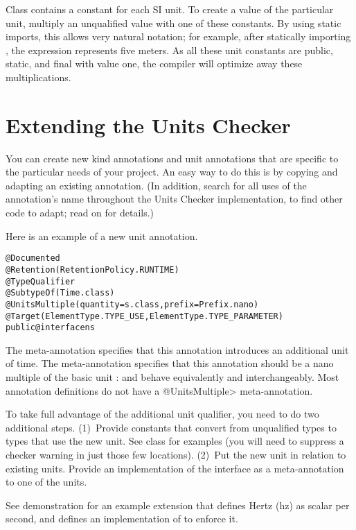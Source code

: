 Class  contains a constant for each SI unit.
To create a value of the particular unit, multiply an unqualified
value with one of these constants.
By using static imports, this allows very natural notation; for
example, after statically importing ,
the expression  represents five meters.
As all these unit constants are public, static, and final with value
one, the compiler will optimize away these multiplications.


\section{Extending the Units Checker\label{extending-units}}

You can create new kind annotations and unit annotations that are specific
to the particular needs of your project.  An easy way to do this is by
copying and adapting an existing annotation.  (In addition, search for all
uses of the annotation's name throughout the Units Checker implementation,
to find other code to adapt; read on for details.)

Here is an example of a new unit annotation.

\begin{alltt}
@Documented
@Retention(RetentionPolicy.RUNTIME)
@TypeQualifier
@SubtypeOf( \ttlcb{} Time.class \ttrcb{} )
@UnitsMultiple(quantity=s.class, prefix=Prefix.nano)
@Target({ElementType.TYPE_USE, ElementType.TYPE_PARAMETER})
public @interface ns \ttlcb{}\ttrcb{}
\end{alltt}

The  meta-annotation specifies that this annotation
introduces an additional unit of time.
The  meta-annotation specifies that this annotation
should be a nano multiple of the basic unit :   and
behave equivalently and interchangeably.
Most annotation definitions do not have a \<@UnitsMultiple> meta-annotation.


To take full advantage of the additional unit qualifier, you need to
do two additional steps.
(1)~Provide constants that convert from unqualified types to types that use
the new unit.  
See class  for examples (you will need to suppress a
checker warning in just those few locations).
(2)~Put the new unit in relation to existing units.
Provide an
implementation of the  interface as a
meta-annotation to one of the units.

See demonstration  for an example
extension that defines Hertz (hz) as scalar per second, and defines an
implementation of  to enforce it.



